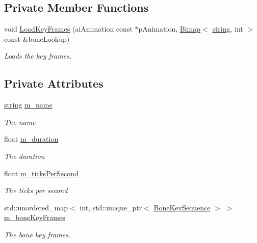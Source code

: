 \subsection*{Private Member Functions}
\begin{DoxyCompactItemize}
\item 
void \hyperlink{class_animation_a49ed3e1b94f6b2e98052071a61aac4a5}{Load\+Key\+Frames} (ai\+Animation const $\ast$p\+Animation, \hyperlink{class_bimap}{Bimap}$<$ \hyperlink{_types_8h_ad453f9f71ce1f9153fb748d6bb25e454}{string}, int $>$ const \&bone\+Lookup)
\begin{DoxyCompactList}\small\item\em Loads the key frames. \end{DoxyCompactList}\end{DoxyCompactItemize}
\subsection*{Private Attributes}
\begin{DoxyCompactItemize}
\item 
\hyperlink{_types_8h_ad453f9f71ce1f9153fb748d6bb25e454}{string} \hyperlink{class_animation_adda9052e1e245ea1c5f1bcb02557ef32}{m\+\_\+name}
\begin{DoxyCompactList}\small\item\em The name \end{DoxyCompactList}\item 
float \hyperlink{class_animation_af74df305fff20e019837dd3f2351befa}{m\+\_\+duration}
\begin{DoxyCompactList}\small\item\em The duration \end{DoxyCompactList}\item 
float \hyperlink{class_animation_aed0aa67f96c0f3ca518e597ae683f791}{m\+\_\+ticks\+Per\+Second}
\begin{DoxyCompactList}\small\item\em The ticks per second \end{DoxyCompactList}\item 
std\+::unordered\+\_\+map$<$ int, std\+::unique\+\_\+ptr$<$ \hyperlink{class_bone_key_sequence}{Bone\+Key\+Sequence} $>$ $>$ \hyperlink{class_animation_a60b1ec3d3b1c19d6682b0e17d41be5e8}{m\+\_\+bone\+Key\+Frames}
\begin{DoxyCompactList}\small\item\em The bone key frames. \end{DoxyCompactList}\end{DoxyCompactItemize}



